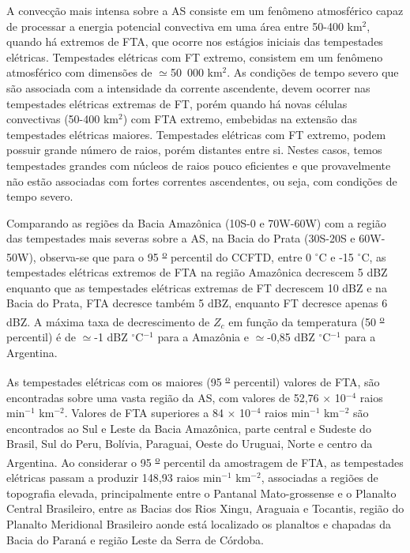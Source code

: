 
A convecção mais intensa sobre a AS consiste em um fenômeno atmosférico capaz de processar a energia potencial convectiva em uma área entre 50-400 km$^{2}$, quando há extremos de FTA, que ocorre nos estágios iniciais das tempestades elétricas. Tempestades elétricas com FT extremo, consistem em um fenômeno  atmosférico com dimensões de $\simeq$50~000 km$^{2}$. As condições de tempo severo que são associada com a intensidade da corrente ascendente, devem ocorrer nas tempestades elétricas extremas de FT, porém quando há novas células convectivas (50-400 km$^{2}$) com FTA extremo, embebidas na extensão das tempestades elétricas maiores. Tempestades elétricas com FT extremo, podem possuir grande número de raios, porém distantes entre si. Nestes casos, temos tempestades grandes com núcleos de raios pouco eficientes e que provavelmente não estão associadas com fortes correntes ascendentes, ou seja, com condições de tempo severo.

Comparando as regiões da Bacia Amazônica (10S-0 e 70W-60W) com a região das tempestades mais severas sobre a AS, na Bacia do Prata (30S-20S e 60W-50W), observa-se que para o 95 \textsuperscript{\underline{o}} percentil do CCFTD, entre 0 $^{\circ}$C e -15 $^{\circ}$C, as tempestades elétricas extremos de FTA na região Amazônica decrescem 5 dBZ enquanto que as tempestades elétricas extremas de FT decrescem 10 dBZ e na Bacia do Prata, FTA decresce também 5 dBZ, enquanto FT decresce apenas 6 dBZ. A máxima taxa de decrescimento de $Z_c$ em função da temperatura (50 \textsuperscript{\underline{o}} percentil) é de $\simeq$-1 dBZ $^{\circ}$C$^{-1}$ para a Amazônia e $\simeq$-0,85 dBZ $^{\circ}$C$^{-1}$ para a Argentina.


As tempestades elétricas com os maiores (95 \textsuperscript{\underline{o}} percentil) valores de FTA, são encontradas sobre uma vasta região da AS, com valores de 52,76 $\times$ 10$^{-4}$ raios min$^{-1}$ km$^{-2}$. Valores de FTA superiores a 84 $\times$ 10$^{-4}$ raios min$^{-1}$ km$^{-2}$ são encontrados ao Sul e Leste da Bacia Amazônica, parte central e Sudeste do Brasil, Sul do Peru, Bolívia, Paraguai, Oeste do Uruguai, Norte e centro da Argentina. Ao considerar o 95 \textsuperscript{\underline{o}} percentil da amostragem de FTA, as tempestades elétricas passam a produzir 148,93 raios min$^{-1}$ km$^{-2}$, associadas a regiões de topografia elevada, principalmente entre o Pantanal Mato-grossense e o Planalto Central Brasileiro, entre as Bacias dos Rios Xingu, Araguaia e Tocantis, região do Planalto Meridional Brasileiro aonde está localizado os planaltos e chapadas da Bacia do Paraná e região Leste da Serra de Córdoba.


